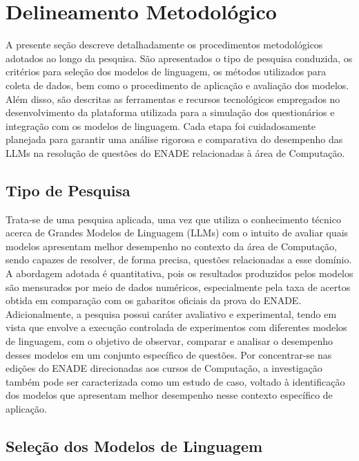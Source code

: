 
\chapter{Delineamento Metodológico}\label{delineamento}

A presente seção descreve detalhadamente os procedimentos metodológicos adotados ao longo da pesquisa. São apresentados o tipo de pesquisa conduzida, os critérios para seleção dos modelos de linguagem, os métodos utilizados para coleta de dados, bem como o procedimento de aplicação e avaliação dos modelos. Além disso, são descritas as ferramentas e recursos tecnológicos empregados no desenvolvimento da plataforma utilizada para a simulação dos questionários e integração com os modelos de linguagem. Cada etapa foi cuidadosamente planejada para garantir uma análise rigorosa e comparativa do desempenho das LLMs na resolução de questões do ENADE relacionadas à área de Computação.


\section{Tipo de Pesquisa}

Trata-se de uma pesquisa aplicada, uma vez que utiliza o conhecimento técnico acerca de Grandes Modelos de Linguagem (LLMs) com o intuito de avaliar quais modelos apresentam melhor desempenho no contexto da área de Computação, sendo capazes de resolver, de forma precisa, questões relacionadas a esse domínio. A abordagem adotada é quantitativa, pois os resultados produzidos pelos modelos são mensurados por meio de dados numéricos, especialmente pela taxa de acertos obtida em comparação com os gabaritos oficiais da prova do ENADE. Adicionalmente, a pesquisa possui caráter avaliativo e experimental, tendo em vista que envolve a execução controlada de experimentos com diferentes modelos de linguagem, com o objetivo de observar, comparar e analisar o desempenho desses modelos em um conjunto específico de questões. Por concentrar-se nas edições do ENADE direcionadas aos cursos de Computação, a investigação também pode ser caracterizada como um estudo de caso, voltado à identificação dos modelos que apresentam melhor desempenho nesse contexto específico de aplicação.


\section{Seleção dos Modelos de Linguagem}

